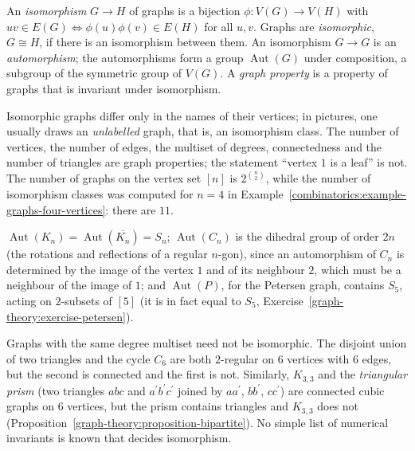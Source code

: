 \begin{definition}\label{graph-theory:definition-isomorphism}
An \emph{isomorphism} $G \to H$ of graphs is a bijection $\phi \colon V(G) \to V(H)$ with $uv \in E(G) \iff \phi(u)\phi(v) \in E(H)$ for all $u, v$. Graphs are \emph{isomorphic},
$G \cong H$, if there is an isomorphism between them. An isomorphism $G \to G$ is an \emph{automorphism}; the automorphisms form a group $\operatorname{Aut}(G)$ under composition, a subgroup of the
symmetric group of $V(G)$. A \emph{graph property} is a property of graphs that is invariant under isomorphism.
\end{definition}

Isomorphic graphs differ only in the names of their vertices; in pictures, one usually draws an \emph{unlabelled} graph, that is, an isomorphism class. The number of vertices, the number of
edges, the multiset of degrees, connectedness and the number of triangles are graph properties; the statement ``vertex $1$ is a leaf'' is not. The number of graphs on the vertex set $[n]$ is
$2^{\binom{n}{2}}$, while the number of isomorphism classes was computed for $n = 4$ in Example~\ref{combinatorics:example-graphs-four-vertices}: there are $11$.

\begin{example}\label{graph-theory:example-automorphisms}
$\operatorname{Aut}(K_n) = \operatorname{Aut}(\overline{K_n}) = S_n$; $\operatorname{Aut}(C_n)$ is the dihedral group of order $2n$ (the rotations and reflections of a regular $n$-gon),
since an automorphism of $C_n$ is determined by the image of the vertex $1$ and of its neighbour $2$, which must be a neighbour of the image of $1$; and $\operatorname{Aut}(P)$, for the Petersen
graph, contains $S_5$, acting on $2$-subsets of $[5]$ (it is in fact equal to $S_5$, Exercise~\ref{graph-theory:exercise-petersen}).
\end{example}

\begin{counterexample}\label{graph-theory:counterexample-same-degrees}
Graphs with the same degree multiset need not be isomorphic. The disjoint union of two triangles and the cycle $C_6$ are both $2$-regular on $6$ vertices with $6$ edges, but the
second is connected and the first is not. Similarly, $K_{3,3}$ and the \emph{triangular prism} (two triangles $abc$ and $a^{\prime}b^{\prime}c^{\prime}$ joined by $aa^{\prime}$, $bb^{\prime}$, $cc^{\prime}$)
are connected cubic graphs on $6$ vertices, but the prism contains triangles and $K_{3,3}$ does not (Proposition~\ref{graph-theory:proposition-bipartite}). No simple list of numerical
invariants is known that decides isomorphism.
\end{counterexample}

